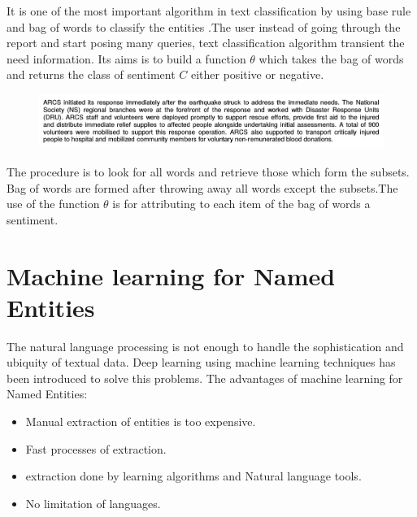 It is one of the most important algorithm in text classification by using base rule and bag of words to classify the entities \citep{manning2012information}.The user instead of going through the report and start posing many queries, text classification algorithm transient the need information.
Its aims is to build a function $\theta$ which takes the bag of words and returns the class of sentiment $C$ either positive or negative.
\newpage
{\centering{$\theta$}

\centering{$\Updownarrow$}   

\begin{figure}[hbtp]
\centering
\includegraphics[scale=0.4]{images/report.png}\label{report}
\end{figure}

{\centering{$\Updownarrow$}}

{}

The procedure is to look for all words and retrieve those which form the subsets.  Bag of words are formed after throwing away  all words except the subsets.The use of the function $\theta$  is for  attributing  to each item of the bag of words a sentiment.}

\section{Machine learning for Named Entities\label{Chapter2}}
The natural language processing is not enough to handle the sophistication and ubiquity of textual data. Deep learning using machine learning techniques has been introduced to solve this problems. The advantages of machine learning for Named Entities:
\begin{itemize}
\item Manual extraction of entities is too expensive.
\item Fast processes of extraction.
\item extraction done by learning algorithms and Natural language tools.
\item No limitation of languages.
\end{itemize}
